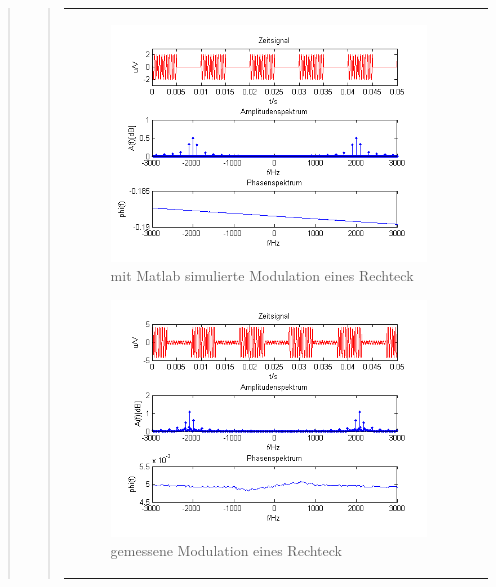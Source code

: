 \begin{quote}
\begin{quote}
\begin{center}
\begin{tabular}{ll}
\begin{minipage}{0.67\textwidth}
                \begin{figure}[H]
                    \includegraphics[scale=0.7]{Bilder/Am_Rec_2k_100Hz_mo_simu}
                    \caption{mit Matlab simulierte Modulation eines Rechteck}
                    \label{fig:Morechtecksimu}
                \end{figure}
        
            \end{minipage}
    
            \begin{minipage}{0.67\textwidth}
                \begin{figure}[H]
                    \includegraphics[scale=0.7]{Bilder/Am_Rec_2k_100Hz_mo}
                    \caption{gemessene Modulation eines Rechteck}
                     \label{fig:Morechteck}
                \end{figure}
        

\end{minipage}
\end{tabular}
\end{center}
\end{quote}
\end{quote}

